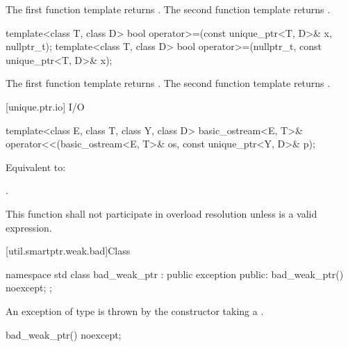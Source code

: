\begin{itemdescr}
\pnum
\returns
The first function template returns .
The second function template returns .
\end{itemdescr}

%
\begin{itemdecl}
template<class T, class D>
  bool operator>=(const unique_ptr<T, D>& x, nullptr_t);
template<class T, class D>
  bool operator>=(nullptr_t, const unique_ptr<T, D>& x);
\end{itemdecl}

\begin{itemdescr}
\pnum
\returns
The first function template returns .
The second function template returns .
\end{itemdescr}

[unique.ptr.io]{ I/O}

%
\begin{itemdecl}
template<class E, class T, class Y, class D>
  basic_ostream<E, T>& operator<<(basic_ostream<E, T>& os, const unique_ptr<Y, D>& p);
\end{itemdecl}

\begin{itemdescr}
\pnum
\effects Equivalent to: 

\pnum
\returns {}.

\pnum
\remarks This function shall not participate in overload resolution
unless  is a valid expression.
\end{itemdescr}

%
[util.smartptr.weak.bad]{Class }
%
\begin{codeblock}
namespace std {
  class bad_weak_ptr : public exception {
  public:
    bad_weak_ptr() noexcept;
  };
}
\end{codeblock}

\pnum
An exception of type  is thrown by the 
constructor taking a .

%
%
\begin{itemdecl}
bad_weak_ptr() noexcept;
\end{itemdecl}

